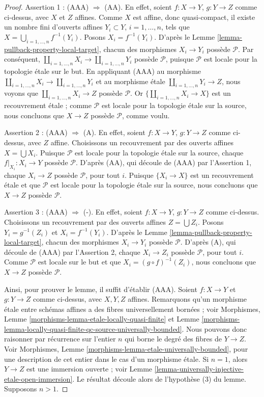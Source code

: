 \begin{proof}
\medskip\noindent
Assertion 1 : (AAA) $\Rightarrow$ (AA).
En effet, soient $f : X \to Y$, $g : Y \to Z$ comme ci-dessus, avec $X$ et
$Z$ affines. Comme $X$ est affine, donc quasi-compact, il existe un nombre fini
d'ouverts affines $Y_i \subset Y$, $i = 1, \ldots, n$, tels que
$X = \bigcup_{i = 1, \ldots, n} f^{-1}(Y_i)$. Posons
$X_i = f^{-1}(Y_i)$. D'après le
Lemme \ref{lemma-pullback-property-local-target}, chacun des morphismes
$X_i \to Y_i$ possède $\mathcal{P}$. Par conséquent,
$\coprod_{i = 1, \ldots, n} X_i \to \coprod_{i = 1, \ldots, n} Y_i$ possède
$\mathcal{P}$, puisque $\mathcal{P}$ est locale pour la topologie \'etale sur
le but. En appliquant (AAA) au morphisme
$\coprod_{i = 1, \ldots, n} X_i \to \coprod_{i = 1, \ldots, n} Y_i$ et au
morphisme \'etale $\coprod_{i = 1, \ldots, n} Y_i \to Z$, nous voyons que
$\coprod_{i = 1, \ldots, n} X_i \to Z$ possède $\mathcal{P}$. Or
$\{\coprod_{i = 1, \ldots, n} X_i \to X\}$ est un recouvrement \'etale ;
comme $\mathcal{P}$ est locale pour la topologie \'etale sur la source, nous
concluons que $X \to Z$ possède $\mathcal{P}$, comme voulu.

\medskip\noindent
Assertion 2 : (AAA) $\Rightarrow$ (A).
En effet, soient $f : X \to Y$, $g : Y \to Z$ comme ci-dessus, avec $Z$
affine. Choisissons un recouvrement par des ouverts affines
$X = \bigcup X_i$. Puisque $\mathcal{P}$ est locale pour la topologie \'etale
sur la source, chaque $f|_{X_i} : X_i \to Y$ possède $\mathcal{P}$. D'après
(AA), qui découle de (AAA) par l'Assertion 1, chaque $X_i \to Z$ possède
$\mathcal{P}$, pour tout $i$. Puisque $\{X_i \to X\}$ est un recouvrement
\'etale et que
$\mathcal{P}$ est locale pour la topologie \'etale sur la source, nous
concluons que $X \to Z$ possède $\mathcal{P}$.

\medskip\noindent
Assertion 3 : (AAA) $\Rightarrow$ (-).
En effet, soient $f : X \to Y$, $g : Y \to Z$ comme ci-dessus. Choisissons un
recouvrement par des ouverts affines $Z = \bigcup Z_i$. Posons
$Y_i = g^{-1}(Z_i)$ et $X_i = f^{-1}(Y_i)$. D'après le
Lemme \ref{lemma-pullback-property-local-target}, chacun des morphismes
$X_i \to Y_i$ possède $\mathcal{P}$. D'après (A), qui découle de (AAA) par
l'Assertion 2, chaque $X_i \to Z_i$ possède $\mathcal{P}$, pour tout $i$.
Comme $\mathcal{P}$
est locale sur le but et que $X_i = (g \circ f)^{-1}(Z_i)$, nous concluons que
$X \to Z$ possède $\mathcal{P}$.

\medskip\noindent
Ainsi, pour prouver le lemme, il suffit d'établir (AAA).
Soient $f : X \to Y$ et $g : Y \to Z$ comme ci-dessus, avec $X, Y, Z$
affines. Remarquons qu'un morphisme \'etale entre schémas affines a des fibres
universellement bornées ; voir Morphismes,
Lemme \ref{morphisms-lemma-etale-locally-quasi-finite} et
Lemme \ref{morphisms-lemma-locally-quasi-finite-qc-source-universally-bounded}.
Nous pouvons donc raisonner par récurrence sur l'entier $n$ qui borne le degré
des fibres de $Y \to Z$. Voir Morphismes,
Lemme \ref{morphisms-lemma-etale-universally-bounded}, pour une description de
cet entier dans le cas d'un morphisme \'etale.
Si $n = 1$, alors $Y \to Z$ est une immersion ouverte ; voir
Lemme \ref{lemma-universally-injective-etale-open-immersion}. Le résultat
découle alors de l'hypothèse (3) du lemme. Supposons $n > 1$.


\end{proof}
